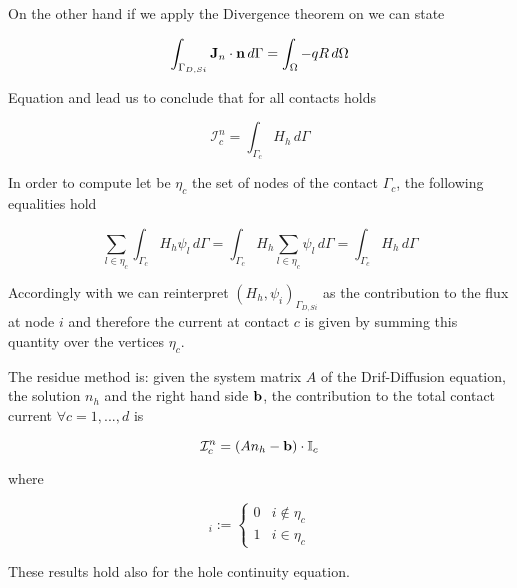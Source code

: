 On the other hand if we apply the Divergence theorem on  we can state 

\begin{equation}
\label{eq: lec divergence theor}
\int_{\Gamma_{D,Si}} \mathbf{J}_n \cdot \mathbf{n} \, d\Gamma = \int_{\Omega} - qR \, d\Omega
\end{equation}

Equation  and   lead us to conclude that for all contacts holds

\begin{equation}
\label{eq: flux current formula}
\mathcal{I}_c^n = \int_{\Gamma_c} H_h \, d\Gamma
\end{equation}

In order to compute  let be $\eta_{c}$ the set of nodes of the contact $\Gamma_c$, the following equalities hold

\begin{equation}
\label{eq: equalities integrals}
\sum_{l \in \eta_c} \int_{\Gamma_c} H_h \psi_l \, d\Gamma 
=  \int_{\Gamma_c} H_h \sum_{l \in \eta_{c}} \psi_l \,d\Gamma 
= \int_{\Gamma_c} H_h \, d\Gamma
\end{equation}


Accordingly with   we can reinterpret $(H_h,\psi_i)_{\Gamma_{D,Si}}$ as the contribution to the flux at node $i$ and therefore the current at contact $c$ is given by summing this quantity  over the vertices $\eta_{c}$.

The residue method is:
given the system matrix $A$ of the Drif-Diffusion equation, the solution $n_h$ and the right hand side $\mathbf{b}$, the contribution to the total contact current $\forall c = 1,...,d$ is

\begin{equation}
\mathcal{I}_c^n = (An_h-\mathbf{b})\cdot \mathbb{I}_c
\end{equation} 

where

\begin{equation}
[\mathbb{I}_c]_i := \left\{ \begin{array}{ll}
0 & i \notin \eta_c \\
1 & i \in \eta_c
\end{array}  \right.
\end{equation} 

These results hold also for the hole continuity equation. 

